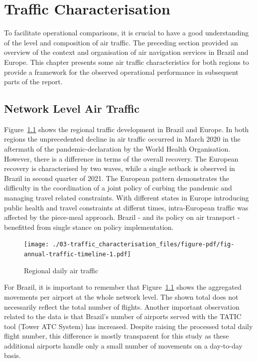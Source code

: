 \documentclass[
  a4paper,
  DIV=11,
  numbers=noendperiod]{scrreport}
\begin{document}
\hypertarget{traffic-characterisation}{%
\chapter{Traffic Characterisation}\label{traffic-characterisation}}

To facilitate operational comparisons, it is crucial to have a good
understanding of the level and composition of air traffic. The preceding
section provided an overview of the context and organisation of air
navigation services in Brazil and Europe. This chapter presents some air
traffic characteristics for both regions to provide a framework for the
observed operational performance in subsequent parts of the report.

\hypertarget{network-level-air-traffic}{%
\section{Network Level Air Traffic}\label{network-level-air-traffic}}

Figure~\ref{fig-annual-traffic-timeline} shows the regional traffic
development in Brazil and Europe. In both regions the unprecedented
decline in air traffic occurred in March 2020 in the aftermath of the
pandemic-declaration by the World Health Organisation. However, there is
a difference in terms of the overall recovery. The European recovery is
characterised by two waves, while a single setback is observed in Brazil
in second quarter of 2021. The European pattern demonstrates the
difficulty in the coordination of a joint policy of curbing the pandemic
and managing travel related constraints. With different states in Europe
introducing public health and travel constraints at differnt times,
intra-European traffic was affected by the piece-meal approach. Brazil -
and its policy on air transport - benefitted from single stance on
policy implementation.

\begin{figure}[H]

{\centering \texttt{[image: ./03-traffic\_characterisation\_files/figure-pdf/fig-annual-traffic-timeline-1.pdf]}

}

\caption{\label{fig-annual-traffic-timeline}Regional daily air traffic}

\end{figure}

For Brazil, it is important to remember that
Figure~\ref{fig-annual-traffic-timeline} shows the aggregated movements
per airport at the whole network level. The shown total does not
necessarily reflect the total number of flights. Another important
observation related to the data is that Brazil's number of airports
served with the TATIC tool (Tower ATC System) has increased. Despite
raising the processed total daily flight number, this difference is
mostly transparent for this study as these additional airports handle
only a small number of movements on a day-to-day basis.
\end{document}
